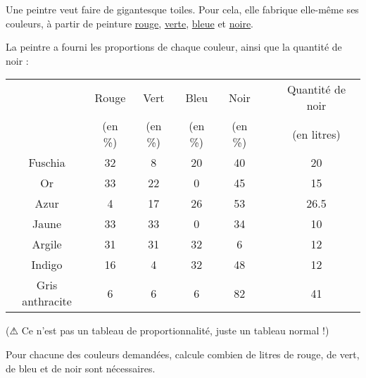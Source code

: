 \documentclass[a4paper,12pt]{article}
\begin{document}
\begin{attention}[frametitle={Exercice 2}]
	Une peintre veut faire de gigantesque toiles. Pour cela, elle fabrique elle-même ses couleurs, à partir de peinture \uline{rouge}, \uline{verte}, \uline{bleue} et \uline{noire}.

	La peintre a fourni les proportions de chaque couleur, ainsi que la quantité de noir : \vspace{1em}

	\renewcommand{\arraystretch}{1.2}
	\begin{tabular}{|c|c|c|c|c|c|c|}
		\hline
		                & Rouge   & Vert    & Bleu    & Noir    &  & Quantité de noir \\
		                & (en \%) & (en \%) & (en \%) & (en \%) &  & (en litres)      \\ \hline
		Fuschia         & 32      & 8       & 20      & 40      &  & 20               \\ \hline
		Or              & 33      & 22      & 0       & 45      &  & 15               \\ \hline
		Azur            & 4       & 17      & 26      & 53      &  & 26.5             \\ \hline
		Jaune           & 33      & 33      & 0       & 34      &  & 10               \\ \hline
		Argile          & 31      & 31      & 32      & 6       &  & 12               \\ \hline
		Indigo          & 16      & 4       & 32      & 48      &  & 12               \\ \hline
		Gris anthracite & 6       & 6       & 6       & 82      &  & 41               \\ \hline
	\end{tabular}
	\renewcommand{\arraystretch}{1}

	\begin{center}
		(⚠ Ce n'est pas un tableau de proportionnalité, juste un tableau normal !)
	\end{center}
	\vspace{0.5em}

	Pour chacune des couleurs demandées, calcule combien de litres de rouge, de vert, de bleu et de noir sont nécessaires.
\end{attention}
\end{document}
